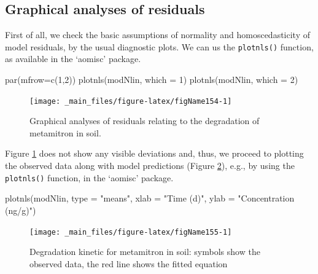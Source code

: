 \documentclass[a4paper,12pt,oneside]{book}
\newenvironment{Shaded}{\begin{snugshade}}{\end{snugshade}}
\newcommand{\DecValTok}[1]{#1}
\newcommand{\StringTok}[1]{#1}
\newcommand{\FunctionTok}[1]{#1}
\newcommand{\AttributeTok}[1]{#1}
\newcommand{\NormalTok}[1]{#1}
\begin{document}
\hypertarget{graphical-analyses-of-residuals}{%
\subsection{Graphical analyses of residuals}\label{graphical-analyses-of-residuals}}

First of all, we check the basic assumptions of normality and homoscedasticity of model residuals, by the usual diagnostic plots. We can us the \texttt{plotnls()} function, as available in the `aomisc' package.

\begin{Shaded}
\begin{Highlighting}[]
\FunctionTok{par}\NormalTok{(}\AttributeTok{mfrow=}\FunctionTok{c}\NormalTok{(}\DecValTok{1}\NormalTok{,}\DecValTok{2}\NormalTok{))}
\FunctionTok{plotnls}\NormalTok{(modNlin, }\AttributeTok{which =} \DecValTok{1}\NormalTok{)}
\FunctionTok{plotnls}\NormalTok{(modNlin, }\AttributeTok{which =} \DecValTok{2}\NormalTok{)}
\end{Highlighting}
\end{Shaded}

\begin{figure}

{\centering \texttt{[image: \_main\_files/figure-latex/figName154-1]} 

}

\caption{Graphical analyses of residuals relating to the degradation of metamitron in soil.}\label{fig:figName154}
\end{figure}

Figure \ref{fig:figName154} does not show any visible deviations and, thus, we proceed to plotting the observed data along with model predictions (Figure \ref{fig:figName155}), e.g., by using the \texttt{plotnls()} function, in the `aomisc' package.

\begin{Shaded}
\begin{Highlighting}[]
\FunctionTok{plotnls}\NormalTok{(modNlin, }\AttributeTok{type =} \StringTok{"means"}\NormalTok{,}
        \AttributeTok{xlab =} \StringTok{"Time (d)"}\NormalTok{, }\AttributeTok{ylab =} \StringTok{"Concentration (ng/g)"}\NormalTok{)}
\end{Highlighting}
\end{Shaded}

\begin{figure}

{\centering \texttt{[image: \_main\_files/figure-latex/figName155-1]} 

}

\caption{Degradation kinetic for metamitron in soil: symbols show the observed data, the red line shows the fitted equation}\label{fig:figName155}
\end{figure}
\end{document}
